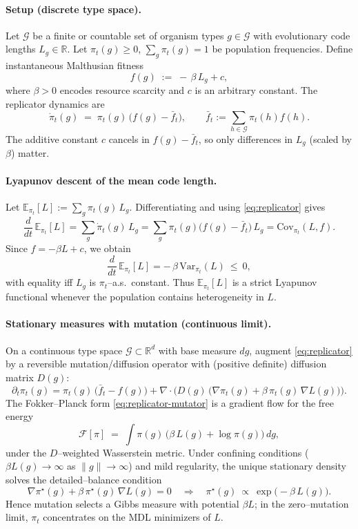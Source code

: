 \documentclass[11pt,a4paper]{article}
\begin{document}
\paragraph{Setup (discrete type space).}
Let $\mathcal{G}$ be a finite or countable set of organism types $g\in\mathcal{G}$ with evolutionary code lengths $L_g\in\mathbb{R}$. Let $\pi_t(g)\ge 0$, $\sum_g \pi_t(g)=1$ be population frequencies. Define instantaneous Malthusian fitness
\[
f(g)\;:=\;-\,\beta\,L_g + c,
\]
where $\beta>0$ encodes resource scarcity and $c$ is an arbitrary constant. The replicator dynamics are
\begin{equation}
\dot{\pi}_t(g)\;=\;\pi_t(g)\,\big( f(g)-\bar f_t\big),\qquad
\bar f_t:=\sum_{h\in\mathcal{G}}\pi_t(h)f(h).
\label{eq:replicator}
\end{equation}
The additive constant $c$ cancels in $f(g)-\bar f_t$, so only differences in $L_g$ (scaled by $\beta$) matter.

\paragraph{Lyapunov descent of the mean code length.}
Let $\mathbb{E}_{\pi_t}[L]:=\sum_g \pi_t(g)\,L_g$. Differentiating and using \eqref{eq:replicator} gives
\[
\frac{d}{dt}\,\mathbb{E}_{\pi_t}[L]
= \sum_g \dot{\pi}_t(g)\,L_g
= \sum_g \pi_t(g)\big(f(g)-\bar f_t\big)\,L_g
= \mathrm{Cov}_{\pi_t}(L,f).
\]
Since $f=-\beta L + c$, we obtain
\begin{equation}
\frac{d}{dt}\,\mathbb{E}_{\pi_t}[L]
= -\,\beta\,\mathrm{Var}_{\pi_t}(L)\ \le\ 0,
\label{eq:Lyapunov}
\end{equation}
with equality iff $L_g$ is $\pi_t$–a.s.\ constant. Thus $\mathbb{E}_{\pi_t}[L]$ is a strict Lyapunov functional whenever the population contains heterogeneity in $L$.

\paragraph{Stationary measures with mutation (continuous limit).}
On a continuous type space $\mathcal{G}\subset\mathbb{R}^d$ with base measure $dg$, augment \eqref{eq:replicator} by a reversible mutation/diffusion operator with (positive definite) diffusion matrix $D(g)$:
\begin{equation}
\partial_t \pi_t(g)
= \pi_t(g)\,\big(\bar f_t - f(g)\big)
+ \nabla\!\cdot\!\Big(D(g)\,\big(\nabla \pi_t(g)+\beta\,\pi_t(g)\,\nabla L(g)\big)\Big).
\label{eq:replicator-mutator}
\end{equation}
The Fokker–Planck form \eqref{eq:replicator-mutator} is a gradient flow for the free energy
\[
\mathcal{F}[\pi]\;=\;\int \pi(g)\,\big(\beta\,L(g)+\log \pi(g)\big)\,dg,
\]
under the $D$–weighted Wasserstein metric. Under confining conditions ($\beta L(g)\to\infty$ as $\|g\|\to\infty$) and mild regularity, the unique stationary density solves the detailed–balance condition
\[
\nabla \pi^\star(g) + \beta\,\pi^\star(g)\,\nabla L(g)=0
\quad\Longrightarrow\quad
\pi^\star(g)\ \propto\ \exp\!\big(-\beta\,L(g)\big).
\]
Hence mutation selects a Gibbs measure with potential $\beta L$; in the zero–mutation limit, $\pi_t$ concentrates on the MDL minimizers of $L$.
\end{document}
